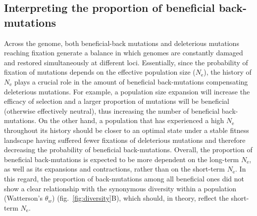 \documentclass{article}
\newcommand{\Ne}{N_{\text{e}}}
\begin{document}
    \subsection*{Interpreting the proportion of beneficial back-mutations}

    Across the genome, both beneficial-back mutations and deleterious mutations reaching fixation generate a balance in which genomes are constantly damaged and restored simultaneously at different loci.
    Essentially, since the probability of fixation of mutations depends on the effective population size ($\Ne$), the history of $\Ne$ plays a crucial role in the amount of beneficial back-mutations compensating deleterious mutations\cite{latrille_inferring_2021}.
    For example, a population size expansion will increase the efficacy of selection and a larger proportion of mutations will be beneficial (otherwise effectively neutral), thus increasing the number of beneficial back-mutations.
    On the other hand, a population that has experienced a high $\Ne$ throughout its history should be closer to an optimal state under a stable fitness landscape having suffered fewer fixations of deleterious mutations and therefore decreasing the probability of beneficial back-mutations\cite{huber_determining_2017}.
    Overall, the proportion of beneficial back-mutations is expected to be more dependent on the long-term $\Ne$, as well as its expansions and contractions, rather than on the short-term $\Ne$\cite{charlesworth_other_2007,huber_determining_2017}.
    In this regard, the proportion of back-mutations among all beneficial ones did not show a clear relationship with the synonymous diversity within a population (Watterson's $\theta_w$) (fig.~\ref{fig:diversity}B), which should, in theory, reflect the short-term $\Ne$.

\end{document}
